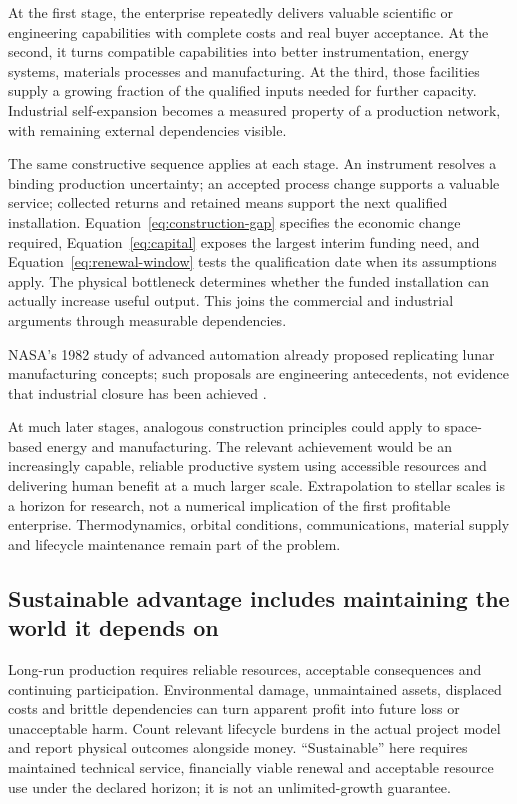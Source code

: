 \documentclass[11pt,letterpaper]{article}
\begin{document}
At the first stage, the enterprise repeatedly delivers valuable scientific or engineering capabilities with complete costs and real buyer acceptance. At the second, it turns compatible capabilities into better instrumentation, energy systems, materials processes and manufacturing. At the third, those facilities supply a growing fraction of the qualified inputs needed for further capacity. Industrial self-expansion becomes a measured property of a production network, with remaining external dependencies visible.

The same constructive sequence applies at each stage. An instrument resolves a binding production uncertainty; an accepted process change supports a valuable service; collected returns and retained means support the next qualified installation. Equation~\eqref{eq:construction-gap} specifies the economic change required, Equation~\eqref{eq:capital} exposes the largest interim funding need, and Equation~\eqref{eq:renewal-window} tests the qualification date when its assumptions apply. The physical bottleneck determines whether the funded installation can actually increase useful output. This joins the commercial and industrial arguments through measurable dependencies.

NASA's 1982 study of advanced automation already proposed replicating lunar manufacturing concepts; such proposals are engineering antecedents, not evidence that industrial closure has been achieved \cite{nasa1982}.

At much later stages, analogous construction principles could apply to space-based energy and manufacturing. The relevant achievement would be an increasingly capable, reliable productive system using accessible resources and delivering human benefit at a much larger scale. Extrapolation to stellar scales is a horizon for research, not a numerical implication of the first profitable enterprise. Thermodynamics, orbital conditions, communications, material supply and lifecycle maintenance remain part of the problem.

\subsection{Sustainable advantage includes maintaining the world it depends on}
Long-run production requires reliable resources, acceptable consequences and continuing participation. Environmental damage, unmaintained assets, displaced costs and brittle dependencies can turn apparent profit into future loss or unacceptable harm. Count relevant lifecycle burdens in the actual project model and report physical outcomes alongside money. ``Sustainable'' here requires maintained technical service, financially viable renewal and acceptable resource use under the declared horizon; it is not an unlimited-growth guarantee.
\end{document}
